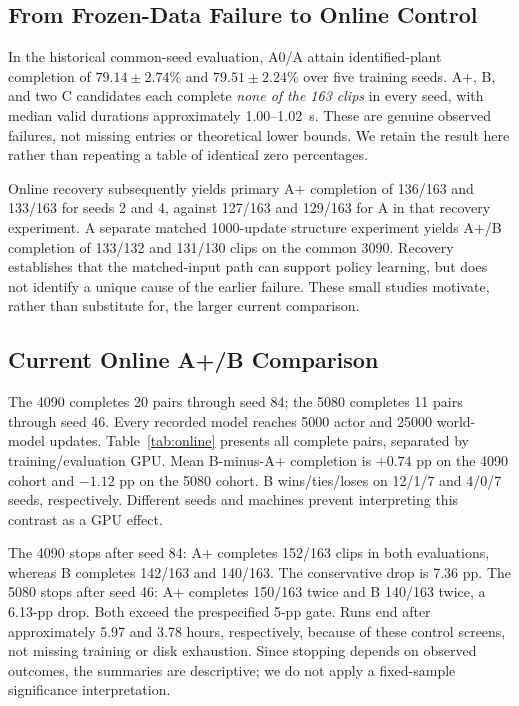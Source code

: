 \subsection{From Frozen-Data Failure to Online Control}
In the historical common-seed evaluation, A0/A attain identified-plant completion of $79.14\pm2.74\%$ and $79.51\pm2.24\%$ over five training seeds. A+, B, and two C candidates each complete \emph{none of the 163 clips} in every seed, with median valid durations approximately 1.00--1.02~s. These are genuine observed failures, not missing entries or theoretical lower bounds. We retain the result here rather than repeating a table of identical zero percentages.

Online recovery subsequently yields primary A+ completion of 136/163 and 133/163 for seeds 2 and 4, against 127/163 and 129/163 for A in that recovery experiment. A separate matched 1000-update structure experiment yields A+/B completion of 133/132 and 131/130 clips on the common 3090. Recovery establishes that the matched-input path can support policy learning, but does not identify a unique cause of the earlier failure. These small studies motivate, rather than substitute for, the larger current comparison.

\subsection{Current Online A+/B Comparison}
The 4090 completes 20 pairs through seed 84; the 5080 completes 11 pairs through seed 46. Every recorded model reaches 5000 actor and 25000 world-model updates. Table~\ref{tab:online} presents all complete pairs, separated by training/evaluation GPU. Mean B-minus-A+ completion is $+0.74$ pp on the 4090 cohort and $-1.12$ pp on the 5080 cohort. B wins/ties/loses on 12/1/7 and 4/0/7 seeds, respectively. Different seeds and machines prevent interpreting this contrast as a GPU effect.

The 4090 stops after seed 84: A+ completes 152/163 clips in both evaluations, whereas B completes 142/163 and 140/163. The conservative drop is 7.36 pp. The 5080 stops after seed 46: A+ completes 150/163 twice and B 140/163 twice, a 6.13-pp drop. Both exceed the prespecified 5-pp gate. Runs end after approximately 5.97 and 3.78 hours, respectively, because of these control screens, not missing training or disk exhaustion. Since stopping depends on observed outcomes, the summaries are descriptive; we do not apply a fixed-sample significance interpretation.

